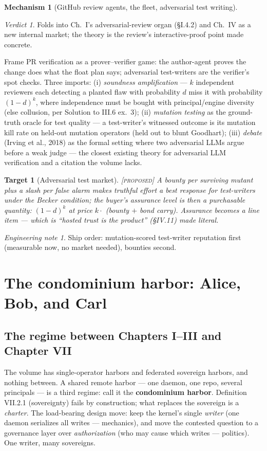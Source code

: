 \documentclass[11pt,a4paper]{article}
\newtheorem{target}{Target}[section]
\theoremstyle{definition}
\newtheorem{mech}{Mechanism}
\theoremstyle{remark}
\newtheorem*{verdict}{Verdict}
\newtheorem*{note}{Engineering note}
\newcommand{\grade}[1]{\textsc{[#1]}}
\begin{document}
\begin{mech}[GitHub review agents, the fleet, adversarial test writing]
\begin{verdict} Folds into Ch.~I's adversarial-review organ (\S I.4.2) and Ch.~IV as a new internal market; the theory is the review's interactive-proof point made concrete. \end{verdict}
Frame PR verification as a prover--verifier game: the author-agent proves the change does what the float plan says; adversarial test-writers are the verifier's spot checks. Three imports: (i) \emph{soundness amplification} --- $k$ independent reviewers each detecting a planted flaw with probability $d$ miss it with probability $(1-d)^k$, where independence must be bought with principal/engine diversity (else collusion, per Solution to III.6 ex.~3); (ii) \emph{mutation testing} as the ground-truth oracle for test quality --- a test-writer's witnessed outcome is its mutation kill rate on held-out mutation operators (held out to blunt Goodhart); (iii) \emph{debate} (Irving et al., 2018) as the formal setting where two adversarial LLMs argue before a weak judge --- the closest existing theory for adversarial LLM verification and a citation the volume lacks.
\begin{target}[Adversarial test market]\grade{proposed} A bounty per surviving mutant plus a slash per false alarm makes truthful effort a best response for test-writers under the Becker condition; the buyer's assurance level is then a purchasable quantity: $(1-d)^k$ at price $k \cdot$ (bounty $+$ bond carry). Assurance becomes a line item --- which is ``hosted trust is the product'' (\S IV.11) made literal. \end{target}
\begin{note} Ship order: mutation-scored test-writer reputation first (measurable now, no market needed), bounties second. \end{note}
\end{mech}

\section{The condominium harbor: Alice, Bob, and Carl}\label{sec:condo}

\subsection{The regime between Chapters I--III and Chapter VII}
The volume has single-operator harbors and federated sovereign harbors, and nothing between. A shared remote harbor --- one daemon, one repo, several principals --- is a third regime: call it the \textbf{condominium harbor}. Definition VII.2.1 (sovereignty) fails by construction; what replaces the sovereign is a \emph{charter}. The load-bearing design move: keep the kernel's single \emph{writer} (one daemon serializes all writes --- mechanics), and move the contested question to a governance layer over \emph{authorization} (who may cause which writes --- politics). One writer, many sovereigns.
\end{document}
